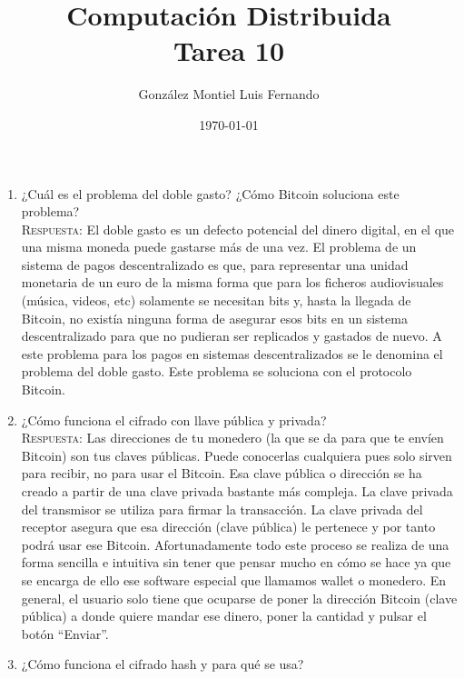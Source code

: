\documentclass[letterpaper,10pt]{article}
\title{Computación Distribuida \\ Tarea 10}
\author{González Montiel Luis Fernando \\}
\date{\today}
\begin{document}
\maketitle

	\begin{enumerate}

    \item ¿Cuál es el problema del doble gasto? ¿Cómo Bitcoin soluciona este problema? \\

    \textsc{Respuesta:}
    El doble gasto es un defecto potencial del dinero digital, en el que una misma moneda puede gastarse más de una vez.
El problema de un sistema de pagos descentralizado es que, para representar una unidad monetaria de un euro de la misma forma que para los ficheros audiovisuales (música, videos, etc) solamente se necesitan bits y, hasta la llegada de Bitcoin, no existía ninguna forma de asegurar esos bits en un sistema descentralizado para que no pudieran ser replicados y gastados de nuevo. A este problema para los pagos en sistemas descentralizados se le denomina el problema del doble gasto.
Este problema se soluciona con el protocolo Bitcoin.
    \\
	
    \item ¿Cómo funciona el cifrado con llave pública y privada?\\

    \textsc{Respuesta:}
    Las direcciones de tu monedero (la que se da para que te envíen Bitcoin) son tus claves públicas. Puede conocerlas cualquiera pues solo sirven para recibir, no para usar el Bitcoin. Esa clave pública o dirección se ha creado a partir de una clave privada bastante más compleja. La clave privada del transmisor se utiliza para firmar la transacción. La clave privada del receptor asegura que esa dirección (clave pública) le pertenece y por tanto podrá usar ese Bitcoin. Afortunadamente todo este proceso se realiza de una forma sencilla e intuitiva sin tener que pensar mucho en cómo se hace ya que se encarga de ello ese software especial que llamamos wallet o monedero. En general, el usuario solo tiene que ocuparse de poner la dirección Bitcoin (clave pública) a donde quiere mandar ese dinero, poner la cantidad y pulsar el botón “Enviar”.
    \\
    
    \item ¿Cómo funciona el cifrado hash y para qué se usa?\\


\end{enumerate}
\end{document}
